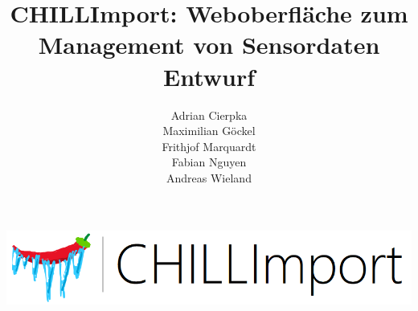 \documentclass[a4paper, 12pt, titlepage]{article}
\author{
Adrian Cierpka \\
Maximilian Göckel \\
Frithjof Marquardt \\
Fabian Nguyen \\
Andreas Wieland
\vspace{3cm}}
\title{CHILLImport: Weboberfläche zum Management von Sensordaten\\\vspace{2cm}
\Large Entwurf\\\vspace{4cm}}
\begin{document}
\includegraphics[scale=1]{logo}
\maketitle
\clearpage
\tableofcontents
\clearpage
{} 


%

%





%
%

%
\end{document}
